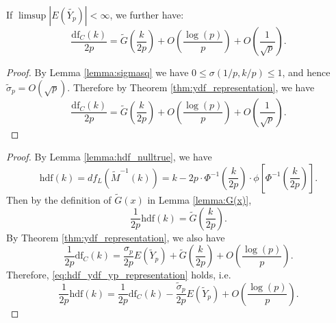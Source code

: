 \begin{corollary}
	\label{corollary:Yp_order}
	If $\limsup |E(\tilde{Y_p})| < \infty$, we further have:
	\begin{equation}
	\frac{\text{df}_C(k)}{2p} = \tilde{G}\left(\frac{k}{2p}\right) + O\left(\frac{\log(p)}{p}\right) + O\left(\frac{1}{\sqrt{p}}\right).
	\label{eq:ydf/2p_representation_remark}
	\end{equation}
\end{corollary}
\begin{proof}
	By Lemma \ref{lemma:sigmasq} we have $0 \le \sigma(1/p,k/p) \le 1$, and hence $\tilde{\sigma}_p = O(\sqrt{p})$. Therefore by Theorem \ref{thm:ydf_representation}, we have
	\begin{equation*}
	\frac{\text{df}_C(k)}{2p}=  \tilde{G}\left(\frac{k}{2p}\right) + O\left( \frac{\log(p)}{p}\right) + O\left(\frac{1}{\sqrt{p}}\right).
	\end{equation*}	
\end{proof}

\dfasy*

\begin{proof}
	By Lemma \ref{lemma:hdf_nulltrue}, we have
	\begin{equation*}
	\text{hdf}(k) = df_L(\tilde{M}^{-1}(k)) = k - 2p\cdot \Phi^{-1} \left(\frac{k}{2p}\right) \cdot \phi\left[\Phi^{-1}\left(\frac{k}{2p}\right) \right].
	\end{equation*}
	Then by the definition of $\tilde{G}(x)$ in Lemma \ref{lemma:G(x)},
	\begin{equation*}
	\frac{1}{2p} \text{hdf}(k) = \tilde{G}\left(\frac{k}{2p}\right).
	\end{equation*}
	By Theorem \ref{thm:ydf_representation}, we also have
	\begin{equation*}
	\frac{1}{2p}\text{df}_C(k) = \frac{\sigma_p}{2p}E(\tilde{Y}_p) + \tilde{G}\left(\frac{k}{2p}\right) + O\left(\frac{\log(p)}{p} \right).
	\end{equation*}
	Therefore, \eqref{eq:hdf_ydf_yp_representation} holds, i.e.
	\begin{equation*}
	\frac{1}{2p} \text{hdf}(k) = \frac{1}{2p}\text{df}_C(k) - \frac{\tilde{\sigma}_p}{2p}E(\tilde{Y}_p) + O\left(\frac{\log(p)}{p} \right).
	\end{equation*}
\end{proof}

